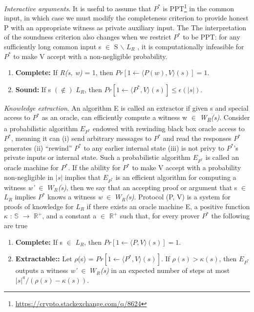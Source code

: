 \documentclass[a4paper]{article}
\newcommand{\quotes}[1]{``#1''}
\begin{document}
\textit{Interactive arguments}. It is useful to assume that \textit{$P^{*}$} is PPT\footnote{\url{https://crypto.stackexchange.com/q/8624}} in the common input, in which case we must modify the completeness criterion to provide honest P with an appropriate witness as private auxiliary input. The The interpretation of the soundness criterion also changes when we restrict \textit{$P^{*}$} to be PPT: for any sufficiently long common input s $\in$ S \ensuremath{\backslash} \textit{$L_R$} , it is computationally infeasible for \textit{$P^{*}$} to make V accept with a non-negligible probability.
\begin{enumerate}
  \item \textbf{Complete:}  If \textit{R(s, w)} = 1, then $Pr[1 \gets \langle P(w), V \rangle (s)] = 1$.
  \item \textbf{Sound:}  If s $(\notin)$ \textit{$L_R$}, then $Pr[1 \gets \langle P^{*}, V \rangle (s)] \le \epsilon(|s|)$.
\end{enumerate}
\textit{Knowledge extraction}. An algorithm E is called an extractor if given s and special access to \textit{$P^{*}$} as an oracle, can efficiently compute a witness w $\in$ \textit{W\textsubscript{R}(s)}. Consider a probabilistic algorithm $E_{P^{*}}$ endowed with rewinding black box oracle access to \textit{$P^{*}$}, meaning it can (i) send arbitrary messages to \textit{$P^{*}$} and read the responses \textit{$P^{*}$} generates  (ii) \quotes{rewind} \textit{$P^{*}$} to any earlier internal state (iii) is not privy to \textit{$P^{*}$}’s private inputs or internal state. Such a probabilistic algorithm $E_{P^{*}}$ is called an oracle machine for \textit{$P^{*}$}. If the ability for \textit{$P^{*}$} to make V accept with a probability non-negligible in $|s|$ implies that $E_{P^{*}}$ is an efficient algorithm for computing a witness \textit{w'} $\in$ \textit{$W_R$(s)}, then we say that an accepting proof or argument that s $\in$ \textit{$L_R$} implies \textit{$P^{*}$} knows a witness \textit{w} $\in$ \textit{$W_R$(s)}.
\newline
Protocol (P, V) is a system for proofs of knowledge for \textit{$L_R$} if there exists an oracle machine E, a positive function \(\kappa\) : $\mathbb{S}$ \(\to\) $\mathbb{R}^{+}$, and a constant a $\in$ $\mathbb{R}^{+}$ such that, for every prover \textit{$P^{*}$} the following are true
\begin{enumerate}
  \item \textbf{Complete:}  If s $\in$ \textit{$L_R$}, then $Pr[1 \gets \langle P, V \rangle (s)] = 1$.
  \item \textbf{Extractable::}  Let \(\rho\)(s) = $Pr[1 \gets \langle P^{*}, V \rangle (s)]$. If $\rho(s) > \kappa(s)$, then $E_{P^{*}}$ outputs a witness \textit{w'} $\in$ \textit{$W_R$(s)} in an expected number of steps at most $ |s|^{a} / (\rho(s) - \kappa(s)) $.
\end{enumerate}
\end{document}
